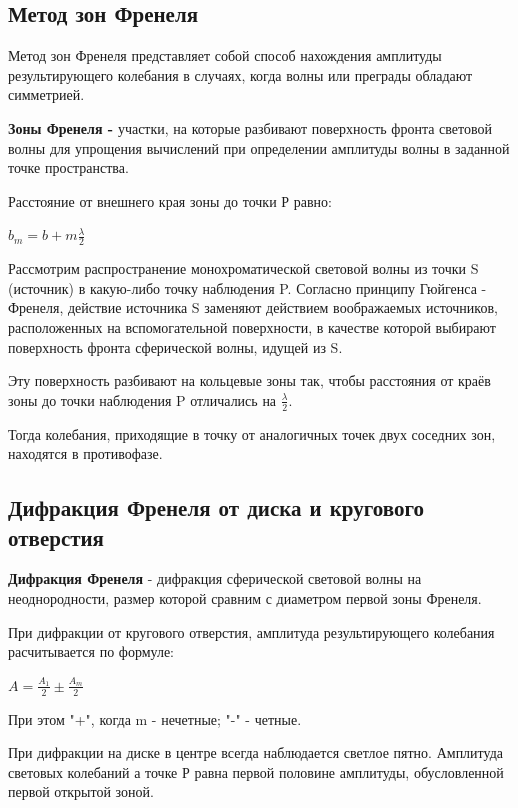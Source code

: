 \documentclass[12pt]{report}
\begin{document}
\subsection{Метод зон Френеля}
Метод зон Френеля представляет собой способ нахождения амплитуды результирующего колебания в случаях, когда волны или преграды обладают симметрией.\par
\textbf{Зоны Френеля -} участки, на которые разбивают поверхность фронта световой волны для упрощения вычислений при определении амплитуды волны в заданной точке пространства.\par
Расстояние от внешнего края зоны до точки Р равно:\par
$b_{m} = b + m \frac{\lambda}{2}$\par
Рассмотрим распространение монохроматической световой волны из точки S (источник) в какую-либо точку наблюдения P. Согласно принципу Гюйгенса - Френеля, действие источника S заменяют действием воображаемых источников, расположенных на вспомогательной поверхности, в качестве которой выбирают поверхность фронта сферической волны, идущей из S.\par
Эту поверхность разбивают на кольцевые зоны так, чтобы расстояния от
краёв зоны до точки наблюдения P отличались на $\frac{\lambda}{2}$.\par
Тогда колебания, приходящие в точку от аналогичных точек двух соседних зон,
находятся в противофазе.\par

\subsection{Дифракция Френеля от диска и кругового отверстия}
\textbf{Дифракция Френеля} - дифракция сферической световой волны на неоднородности, размер которой сравним с диаметром первой зоны Френеля.\par
При дифракции от кругового отверстия, амплитуда результирующего колебания расчитывается по формуле:\par
$A = \frac{A_1}{2} \pm \frac{A_{m}}{2}$\par
При этом "+", когда m - нечетные; "-" - четные.\par
При дифракции на диске в центре всегда наблюдается светлое пятно. Амплитуда световых колебаний а точке Р равна первой половине амплитуды, обусловленной первой открытой зоной.\par
\end{document}
